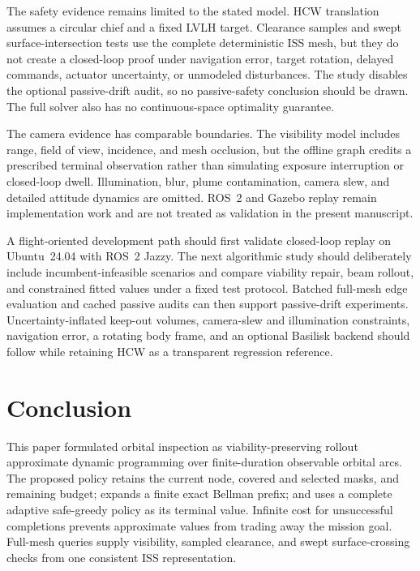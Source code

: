 \documentclass{IEEEtaes}
\theoremstyle{remark}
\theoremstyle{plain}
\begin{document}
The safety evidence remains limited to the stated model. HCW translation assumes a circular chief and a fixed LVLH target. Clearance samples and swept surface-intersection tests use the complete deterministic ISS mesh, but they do not create a closed-loop proof under navigation error, target rotation, delayed commands, actuator uncertainty, or unmodeled disturbances. The study disables the optional passive-drift audit, so no passive-safety conclusion should be drawn. The full solver also has no continuous-space optimality guarantee.

The camera evidence has comparable boundaries. The visibility model includes range, field of view, incidence, and mesh occlusion, but the offline graph credits a prescribed terminal observation rather than simulating exposure interruption or closed-loop dwell. Illumination, blur, plume contamination, camera slew, and detailed attitude dynamics are omitted. ROS~2 and Gazebo replay remain implementation work and are not treated as validation in the present manuscript.

A flight-oriented development path should first validate closed-loop replay on Ubuntu~24.04 with ROS~2 Jazzy. The next algorithmic study should deliberately include incumbent-infeasible scenarios and compare viability repair, beam rollout, and constrained fitted values under a fixed test protocol. Batched full-mesh edge evaluation and cached passive audits can then support passive-drift experiments. Uncertainty-inflated keep-out volumes, camera-slew and illumination constraints, navigation error, a rotating body frame, and an optional Basilisk backend should follow while retaining HCW as a transparent regression reference.

\section{Conclusion}
\label{sec:conclusion}

This paper formulated orbital inspection as viability-preserving rollout approximate dynamic programming over finite-duration observable orbital arcs. The proposed policy retains the current node, covered and selected masks, and remaining budget; expands a finite exact Bellman prefix; and uses a complete adaptive safe-greedy policy as its terminal value. Infinite cost for unsuccessful completions prevents approximate values from trading away the mission goal. Full-mesh queries supply visibility, sampled clearance, and swept surface-crossing checks from one consistent ISS representation.
\end{document}
